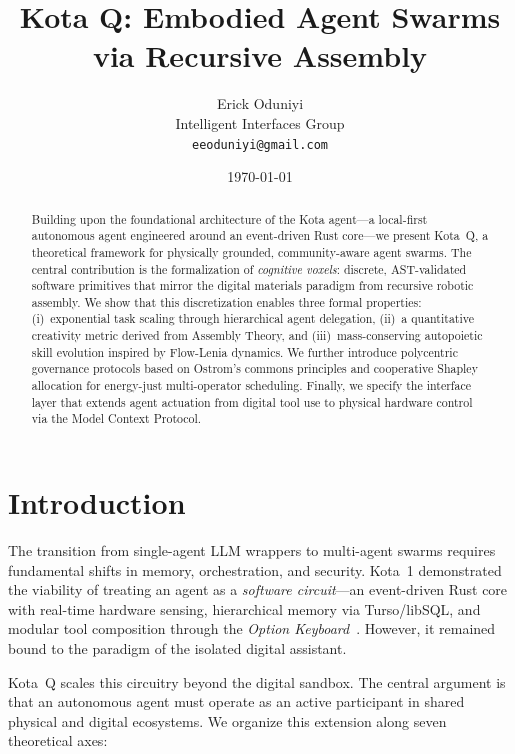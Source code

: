 \documentclass[11pt,a4paper]{article}
\title{\textbf{Kota Q: Embodied Agent Swarms \\ via Recursive Assembly}}
\author{Erick Oduniyi \\ Intelligent Interfaces Group \\ \texttt{eeoduniyi@gmail.com}}
\date{\today}
\begin{document}
\maketitle

\begin{abstract}
Building upon the foundational architecture of the Kota agent---a local-first autonomous agent engineered around an event-driven Rust core---we present Kota~Q, a theoretical framework for physically grounded, community-aware agent swarms. The central contribution is the formalization of \emph{cognitive voxels}: discrete, AST-validated software primitives that mirror the digital materials paradigm from recursive robotic assembly. We show that this discretization enables three formal properties: (i)~exponential task scaling through hierarchical agent delegation, (ii)~a quantitative creativity metric derived from Assembly Theory, and (iii)~mass-conserving autopoietic skill evolution inspired by Flow-Lenia dynamics. We further introduce polycentric governance protocols based on Ostrom's commons principles and cooperative Shapley allocation for energy-just multi-operator scheduling. Finally, we specify the interface layer that extends agent actuation from digital tool use to physical hardware control via the Model Context Protocol.
\end{abstract}

\section{Introduction}

The transition from single-agent LLM wrappers to multi-agent swarms requires fundamental shifts in memory, orchestration, and security. Kota~1 demonstrated the viability of treating an agent as a \emph{software circuit}---an event-driven Rust core with real-time hardware sensing, hierarchical memory via Turso/libSQL, and modular tool composition through the \emph{Option Keyboard}~\citep{abdelrahman2022self}. However, it remained bound to the paradigm of the isolated digital assistant.

Kota~Q scales this circuitry beyond the digital sandbox. The central argument is that an autonomous agent must operate as an active participant in shared physical and digital ecosystems. We organize this extension along seven theoretical axes:
\end{document}
